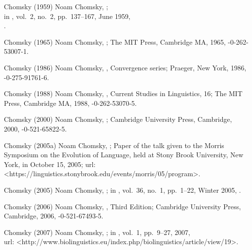 \biblabel Chomsky (1959)
Noam Chomsky,
;\\
in ,
vol.\ 2, no.\ 2, pp.\ 137--167, June 1959,\\
.

\biblabel Chomsky (1965)
Noam Chomsky,
;
The MIT Press, Cambridge MA, 1965,
-0-262-53007-1.

\biblabel Chomsky (1986)
Noam Chomsky,
,
Convergence series;
Praeger, New York, 1986,
-0-275-91761-6.

\biblabel Chomsky (1988)
Noam Chomsky,
,
Current Studies in Linguistics, 16;
The MIT Press, Cambridge MA, 1988,
-0-262-53070-5.

\biblabel Chomsky (2000)
Noam Chomsky,
;
Cambridge University Press, Cambridge, 2000,
-0-521-65822-5.

\biblabel Chomsky (2005a)
Noam Chomsky,
;
Paper of the talk given to the
Morris Symposium on the Evolution of Language,
held at Stony Brook University, New York,
in October 15, 2005;
{\sc url:}
\URL<https://linguistics.stonybrook.edu/events/morris/05/program>.

\biblabel Chomsky (2005)
Noam Chomsky,
;
in ,
vol.\ 36, no.\ 1, pp.\ 1--22, Winter 2005,
.

\biblabel Chomsky (2006)
Noam Chomsky,
, Third Edition;
Cambridge University Press, Cambridge, 2006,
-0-521-67493-5.

\biblabel Chomsky (2007)
Noam Chomsky,
;
in ,
vol.\ 1, pp.\ 9--27, 2007,\\
{\sc url:}
\URL<http://www.biolinguistics.eu/index.php/biolinguistics/article/view/19>.


